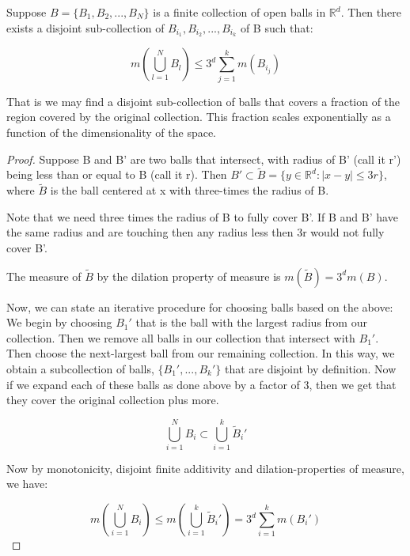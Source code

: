 \documentclass[class=article, crop=false]{standalone}
\begin{document}
			\begin{lemma} 
				Suppose $B = \{B_1, B_2, ..., B_N\}$ is a finite collection of open balls in $\mathbb{R}^d$. Then there exists a disjoint sub-collection of $B_{i_1}, B_{i_2}, ..., B_{i_k}$ of B such that:

					$$m(\bigcup_{l=1}^N B_l) \le 3^d \sum_{j=1}^k m(B_{i_j})$$

				That is we may find a disjoint sub-collection of balls that covers a fraction of the region covered by the original collection. This fraction scales exponentially as a function of the dimensionality of the space.
			\end{lemma}
			\begin{proof}
				Suppose B and B' are two balls that intersect, with radius of B' (call it r') being less than or equal to B (call it r). Then $B' \subset \tilde{B} = \{y \in \mathbb{R}^d : |x-y| \le 3r \}$, where $\tilde{B}$ is the ball centered at x with three-times the radius of B. 

				Note that we need three times the radius of B to fully cover B'. If B and B' have the same radius and are touching then any radius less then 3r would not fully cover B'.

				The measure of $\tilde{B}$ by the dilation property of measure is $m(\tilde{B}) = 3^d m(B)$.

				Now, we can state an iterative procedure for choosing balls based on the above: We begin by choosing $B_1'$ that is the ball with the largest radius from our collection. Then we remove all balls in our collection that intersect with $B_1'$. Then choose the next-largest ball from our remaining collection. In this way, we obtain a subcollection of balls, $\{B_1', ..., B_k'\}$ that are disjoint by definition. Now if we expand each of these balls as done above by a factor of 3, then we get that they cover the original collection plus more.

					$$\bigcup_{i=1}^N B_i \subset \bigcup_{i=1}^k \tilde{B}_i'$$

				Now by monotonicity, disjoint finite additivity and dilation-properties of measure, we have:

					$$m(\bigcup_{i=1}^N B_i) \le m(\bigcup_{i=1}^k \tilde{B}_i') = 3^d \sum_{i=1}^k m(B_i')$$
			\end{proof}
\end{document}
